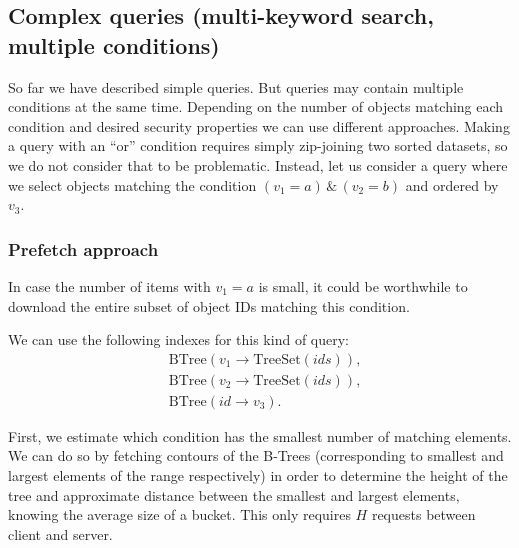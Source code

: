 \documentclass[notitlepage,longbibliography]{revtex4-1}
\begin{document}
\subsection{Complex queries (multi-keyword search, multiple conditions)}  %

So far we have described simple queries.
But queries may contain multiple conditions at the same time.
Depending on the number of objects matching each condition and desired security properties we can use different approaches.
Making a query with an ``or'' condition requires simply zip-joining two sorted datasets, so we do not consider that to be problematic.
Instead, let us consider a query where we select objects matching the condition $(v_1 = a) \,\&\, (v_2 = b)$ and ordered by $v_3$.

\subsubsection{Prefetch approach}
\label{sec:prefetch}
%

In case the number of items with $v_1=a$ is small, it could be worthwhile to download the entire subset of object IDs matching this condition.

We can use the following indexes for this kind of query:
\begin{align*}
    & \mbox{BTree}(v_1 \rightarrow \mbox{TreeSet}(ids)),\\
    & \mbox{BTree}(v_2 \rightarrow \mbox{TreeSet}(ids)),\\
    & \mbox{BTree}(id \rightarrow v_3).
\end{align*}

First, we estimate which condition has the smallest number of matching elements.
We can do so by fetching contours of the B-Trees (corresponding to smallest and largest elements of the range respectively) in order to determine the height of the tree and approximate distance between the smallest and largest elements, knowing the average size of a bucket. This only requires $H$ requests between client and server.
\end{document}
